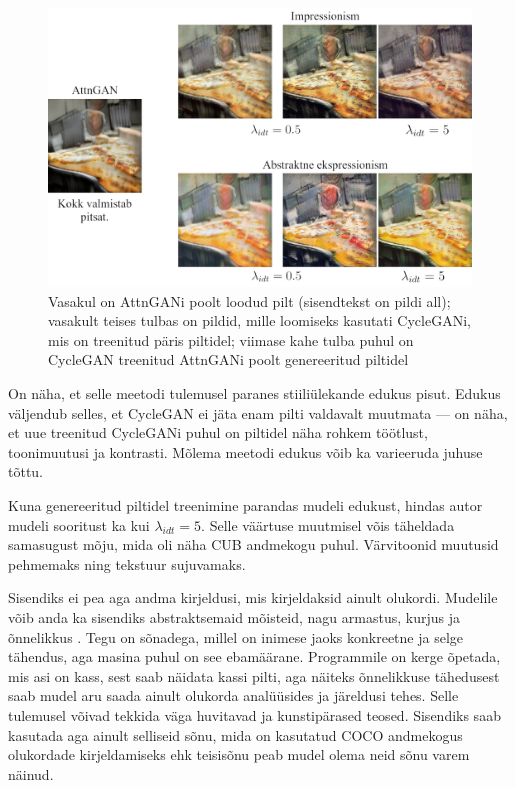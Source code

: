 \documentclass{vilgym}
\begin{document}
	\begin{figure}[t]
		\includegraphics[width=\linewidth]{images/coco.png}
		\caption{Vasakul on AttnGANi poolt loodud pilt (sisendtekst on pildi all); vasakult teises tulbas on pildid, mille loomiseks kasutati CycleGANi, mis on treenitud päris piltidel; viimase kahe tulba puhul on CycleGAN treenitud AttnGANi poolt genereeritud piltidel}
		\label{fig:coco}
	\end{figure}
	On näha, et selle meetodi tulemusel paranes stiiliülekande edukus pisut. Edukus väljendub selles, et CycleGAN ei jäta enam pilti valdavalt muutmata --- on näha, et uue treenitud CycleGANi puhul on piltidel näha rohkem töötlust, toonimuutusi ja kontrasti. Mõlema meetodi edukus võib ka varieeruda juhuse tõttu.

	Kuna genereeritud piltidel treenimine parandas mudeli edukust, hindas autor mudeli sooritust ka kui $ \lambda_{idt} = 5 $. Selle väärtuse muutmisel võis täheldada samasugust mõju, mida oli näha CUB andmekogu puhul. Värvitoonid muutusid pehmemaks ning tekstuur sujuvamaks. 

	Sisendiks ei pea aga andma kirjeldusi, mis kirjeldaksid ainult olukordi. Mudelile võib anda ka sisendiks abstraktsemaid mõisteid, nagu armastus, kurjus ja õnnelikkus . Tegu on sõnadega, millel on inimese jaoks konkreetne ja selge tähendus, aga masina puhul on see ebamäärane. Programmile on kerge õpetada, mis asi on kass, sest saab näidata kassi pilti, aga näiteks õnnelikkuse tähedusest saab mudel aru saada ainult olukorda analüüsides ja järeldusi tehes. Selle tulemusel võivad tekkida väga huvitavad ja kunstipärased teosed. Sisendiks saab kasutada aga ainult selliseid sõnu, mida on kasutatud COCO andmekogus olukordade kirjeldamiseks ehk teisisõnu peab mudel olema neid sõnu varem näinud.
\end{document}
